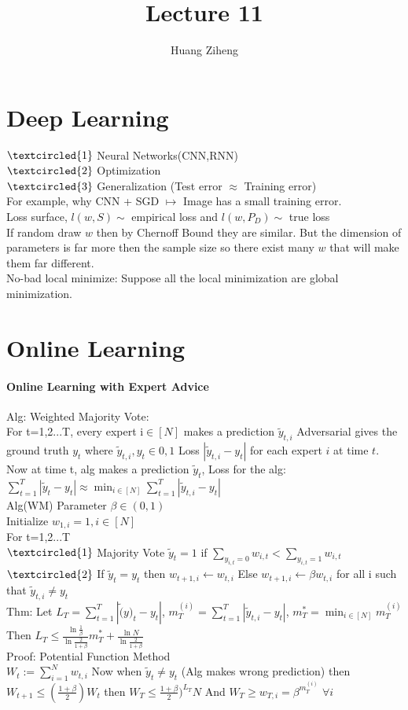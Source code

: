 \documentclass{article}
\author{Huang Ziheng}
\title{Lecture 11}
\begin{document}
\maketitle
\section{Deep Learning}
$\textcircled{1}$ Neural Networks(CNN,RNN)\\
$\textcircled{2}$ Optimization\\
$\textcircled{3}$ Generalization (Test error $\approx$ Training error)\\
For example, why CNN + SGD $\mapsto$ Image has a small training error.\\
Loss surface, $l(w,S)\sim$ empirical loss and $l(w,P_D)\sim$ true loss\\
If random draw $w$ then by Chernoff Bound they are similar. But the dimension of parameters is far more then the sample size so there exist many $w$ that will make them far different.\\
No-bad local minimize: Suppose all the local minimization are global minimization.\\
\section{Online Learning}
\paragraph{Online Learning with Expert Advice}
Alg: Weighted Majority Vote:\\
For t=1,2...T, every expert i$\in[N]$ makes a prediction $\tilde{y}_{t,i}$ Adversarial gives the ground truth $y_t$ where $\tilde{y}_{t,i},y_t\in{0,1}$ Loss $|\tilde{y}_{t,i}-y_t|$ for each expert $i$ at time $t$.\\
Now at time t, alg makes a prediction $\tilde{y}_t$, Loss for the alg:$\sum_{t=1}^T|\tilde{y}_t-y_t|\approx\min_{i\in[N]}\sum_{t=1}^T|\tilde{y}_{t,i}-y_t|$\\
Alg(WM) Parameter $\beta\in(0,1)$\\
Initialize $w_{1,i}=1, i\in[N]$\\
For t=1,2...T\\
$\textcircled{1}$ Majority Vote $\tilde{y}_t=1$ if $\sum_{y_{i,t}=0}w_{i,t}<\sum_{y_{i,t}=1}w_{i,t}$\\
$\textcircled{2}$ If $\tilde{y}_t=y_t$ then $w_{t+1,i}\leftarrow w_{t,i}$ Else $w_{t+1,i}\leftarrow \beta w_{t,i}$ for all i such that $\tilde{y}_{t,i}\neq y_t$\\
Thm:  Let $L_T=\sum_{t=1}^T|\tilde(y)_t-y_t|$, $m_T^{(i)}=\sum_{t=1}^T|\tilde{y}_{t,i}-y_t|$, $m_T^*=\min_{i\in[N]}m_T^{(i)}$\\
Then $L_T\leq \frac{\ln{\frac{1}{\beta}}}{\ln{\frac{2}{1+\beta}}}m_T^*+\frac{\ln{N}}{\ln{\frac{2}{1+\beta}}}$\\
Proof: Potential Function Method\\
$W_t:=\sum_{i=1}^Nw_{t,i}$ Now when $\tilde{y}_t\neq y_t$ (Alg makes wrong prediction) then $W_{t+1}\leq(\frac{1+\beta}{2})W_t$ then $W_T\leq\frac{1+\beta}{2})^{L_T}N$ And $W_T\geq w_{T,i}=\beta^{m_T^{(i)}}$ $\forall i$
\end{document}
